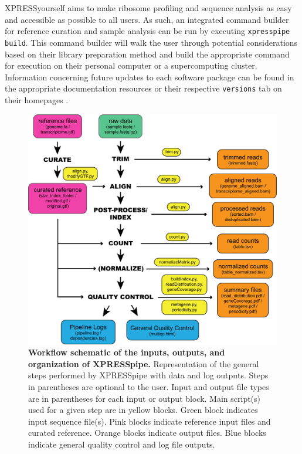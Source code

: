 \documentclass[10pt, oneside]{article}
\begin{document}
XPRESSyourself aims to make ribosome profiling and sequence analysis as easy and accessible as possible to all users. As such, an integrated command builder for reference curation and sample analysis can be run by executing \texttt{xpresspipe build}. This command builder will walk the user through potential considerations based on their library preparation method and build the appropriate command for execution on their personal computer or a supercomputing cluster. Information concerning future updates to each software package can be found in the appropriate documentation resources \cite{xpresspipe_docs, xpressplot_docs} or their respective \texttt{versions} tab on their homepages \cite{xpressyourself}.\\

\begin{figure}
\centering
  \includegraphics[width=160mm]{figures/xpresspipe_figure1.png}
  \caption{\textbf{Workflow schematic of the inputs, outputs, and organization of XPRESSpipe.} Representation of the general steps performed by XPRESSpipe with data and log outputs. Steps in parentheses are optional to the user. Input and output file types are in parentheses for each input or output block. Main script(s) used for a given step are in yellow blocks. Green block indicates input sequence file(s). Pink blocks indicate reference input files and curated reference. Orange blocks indicate output files. Blue blocks indicate general quality control and log file outputs.}
  \label{fig:outputs}
\end{figure}
\end{document}
